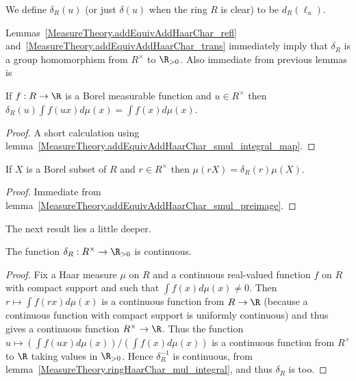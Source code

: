 \begin{definition}
  \label{MeasureTheory.ringHaarChar}
  \leanok
  We define $\delta_R(u)$ (or just $\delta(u)$ when the ring $R$ is clear) to be $d_R(\ell_u)$.
\end{definition}

Lemmas~\ref{MeasureTheory.addEquivAddHaarChar_refl}
and~\ref{MeasureTheory.addEquivAddHaarChar_trans} immediately imply that $\delta_R$ is a group
homomorphism from $R^\times$ to $\R_{>0}$.
Also immediate from previous lemmas is

\begin{lemma}
  \label{MeasureTheory.ringHaarChar_mul_integral}
  \leanok
  If $f:R\to\R$ is a Borel measurable function and $u\in R^\times$ then
  $\delta_R(u)\int f(ux)d\mu(x)=\int f(x)d\mu(x)$.
\end{lemma}
\begin{proof}
  \leanok
  A short calculation using lemma~\ref{MeasureTheory.addEquivAddHaarChar_smul_integral_map}.
\end{proof}

\begin{lemma}
  \label{MeasureTheory.ringHaarChar_mul_volume}
  \leanok
  If $X$ is a Borel subset of $R$ and $r\in R^\times$ then $\mu(rX)=\delta_R(r)\mu(X)$.
\end{lemma}
\begin{proof}
  \leanok
   Immediate from lemma~\ref{MeasureTheory.addEquivAddHaarChar_smul_preimage}.
\end{proof}

The next result lies a little deeper.

\begin{corollary}
  \label{MeasureTheory.ringHaarChar_continuous}
  \leanok
  The function $\delta_R:R^\times\to\R_{>0}$ is continuous.
\end{corollary}
\begin{proof}
  Fix a Haar measure $\mu$ on $R$ and a continuous real-valued function
  $f$ on $R$ with compact support and such that $\int f(x) d\mu(x)\not=0$.
  Then $r \mapsto \int f(rx) d\mu(x)$ is a continuous function
  from $R\to\R$ (because a continuous function with compact support is uniformly
   continuous) and thus gives a continuous function $R^\times\to\R$.
   Thus the function $u\mapsto (\int f(ux) d\mu(x))/(\int f(x)d\mu(x))$ is
   a continuous function from $R^\times$ to $\R$ taking values in $\R_{>0}$.
   Hence $\delta_R^{-1}$ is continuous,
   from lemma~\ref{MeasureTheory.ringHaarChar_mul_integral},
   and thus $\delta_R$ is too.
\end{proof}

